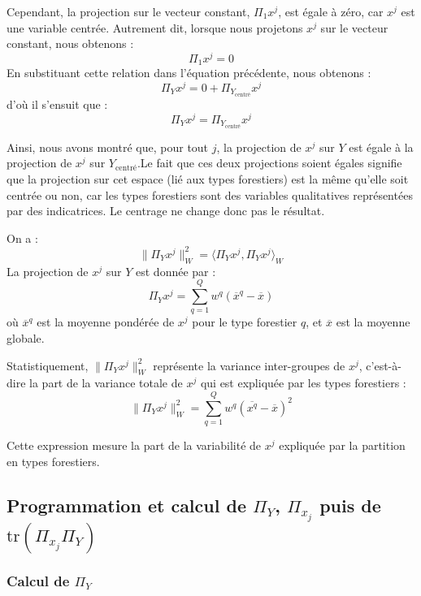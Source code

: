 \documentclass[
]{article}
\begin{document}
Cependant, la projection sur le vecteur constant, \(\Pi_1 x^j\), est
égale à zéro, car \(x^j\) est une variable centrée. Autrement dit,
lorsque nous projetons \(x^j\) sur le vecteur constant, nous obtenons :
\[
\Pi_1 x^j = 0
\] En substituant cette relation dans l'équation précédente, nous
obtenons : \[
\Pi_Y x^j = 0 + \Pi_{Y_{\text{centré}}} x^j
\] d'où il s'ensuit que : \[
\Pi_Y x^j = \Pi_{Y_{\text{centré}}} x^j
\]

Ainsi, nous avons montré que, pour tout \(j\), la projection de \(x^j\)
sur \(Y\) est égale à la projection de \(x^j\) sur
\(Y_{\text{centré}}\).\newline Le fait que ces deux projections soient
égales signifie que la projection sur cet espace (lié aux types
forestiers) est la même qu'elle soit centrée ou non, car les types
forestiers sont des variables qualitatives représentées par des
indicatrices. Le centrage ne change donc pas le résultat.

On a : \[
\| \Pi_Y x^j \|_W^2 = \langle \Pi_Y x^j, \Pi_Y x^j \rangle_W
\] La projection de \(x^j\) sur \(Y\) est donnée par : \[
\Pi_Y x^j = \sum_{q=1}^{Q} w^q (\overline{x}^q - \overline{x})
\] où \(\overline{x}^q\) est la moyenne pondérée de \(x^j\) pour le type
forestier \(q\), et \(\overline{x}\) est la moyenne globale.

Statistiquement, \(\| \Pi_Y x^j \|_W^2\) représente la variance
inter-groupes de \(x^j\), c'est-à-dire la part de la variance totale de
\(x^j\) qui est expliquée par les types forestiers : \[
\| \Pi_Y x^j \|_W^2 = \sum_{q=1}^{Q} w^q (\overline{x^q} - \overline{x})^2
\]

Cette expression mesure la part de la variabilité de \(x^j\) expliquée
par la partition en types forestiers.

\hypertarget{programmation-et-calcul-de-pi_y-pi_x_j-puis-de-texttrpi_x_j-pi_y}{%
\subsection{\texorpdfstring{Programmation et calcul de \(\Pi_Y\),
\(\Pi_{x_j}\) puis de
\(\text{tr}(\Pi_{x_j} \Pi_Y)\)}{Programmation et calcul de \textbackslash Pi\_Y, \textbackslash Pi\_\{x\_j\} puis de \textbackslash text\{tr\}(\textbackslash Pi\_\{x\_j\} \textbackslash Pi\_Y)}}\label{programmation-et-calcul-de-pi_y-pi_x_j-puis-de-texttrpi_x_j-pi_y}}

\hypertarget{calcul-de-pi_y}{%
\subsubsection{\texorpdfstring{Calcul de
\(\Pi_Y\)}{Calcul de \textbackslash Pi\_Y}}\label{calcul-de-pi_y}}
\end{document}
